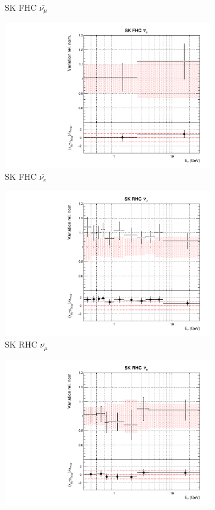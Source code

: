 \begin{figure}
\begin{subfigure}{0.24\textwidth}
  \caption{SK FHC $\bar{\nu_{\mu}}$}
\end{subfigure}
\begin{subfigure}{0.24\textwidth}
  \centering
  \includegraphics[width=0.95\linewidth]{figs/datflux11}
  \caption{SK FHC $\bar{\nu_{e}}$}
\end{subfigure}
\begin{subfigure}{0.24\textwidth}
  \centering
  \includegraphics[width=0.95\linewidth]{figs/datflux12}
  \caption{SK RHC $\bar{\nu_{\mu}}$}
\end{subfigure}
\begin{subfigure}{0.24\textwidth}
  \centering
  \includegraphics[width=0.95\linewidth]{figs/datflux13}

\end{subfigure}
\end{figure}
